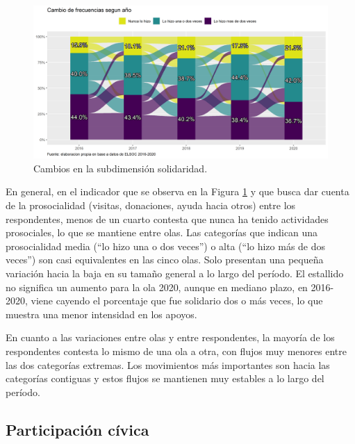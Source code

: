 \documentclass[
  12pt,
]{book}
\begin{document}
\begin{figure}[H]

{\centering \includegraphics[width=1\linewidth,height=1\textheight]{output/graphs/alluvial_solidaridad} 

}

\caption{Cambios en la subdimensión solidaridad.}\label{fig:alluvial-solidaridad}
\end{figure}

En general, en el indicador que se observa en la Figura \ref{fig:alluvial-solidaridad} y que busca dar cuenta de la prosocialidad (visitas, donaciones, ayuda hacia otros) entre los respondentes, menos de un cuarto contesta que nunca ha tenido actividades prosociales, lo que se mantiene entre olas. Las categorías que indican una prosocialidad media (``lo hizo una o dos veces'') o alta (``lo hizo más de dos veces'') son casi equivalentes en las cinco olas. Solo presentan una pequeña variación hacia la baja en su tamaño general a lo largo del período. El estallido no significa un aumento para la ola 2020, aunque en mediano plazo, en 2016-2020, viene cayendo el porcentaje que fue solidario dos o más veces, lo que muestra una menor intensidad en los apoyos.

En cuanto a las variaciones entre olas y entre respondentes, la mayoría de los respondentes contesta lo mismo de una ola a otra, con flujos muy menores entre las dos categorías extremas. Los movimientos más importantes son hacia las categorías contiguas y estos flujos se mantienen muy estables a lo largo del período.

\hypertarget{participaciuxf3n-cuxedvica}{%
\subsection{Participación cívica}\label{participaciuxf3n-cuxedvica}}
\end{document}
